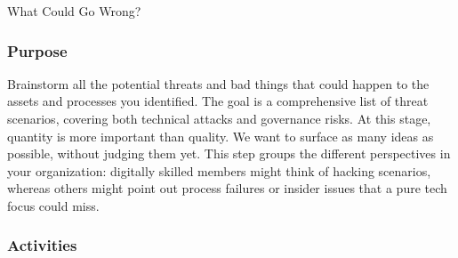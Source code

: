 What Could Go Wrong?

\subsubsection{Purpose}

Brainstorm all the potential threats and bad things that could happen to the
assets and processes you identified. The goal is a comprehensive list of threat
scenarios, covering both technical attacks and governance risks. At this
stage, quantity is more important than quality. We want to surface as many
ideas as possible, without judging them yet. This step groups the different
perspectives in your organization: digitally skilled members might think
of hacking scenarios, whereas others might point out process failures or insider
issues that a pure tech focus could miss.

\subsubsection{Activities}

